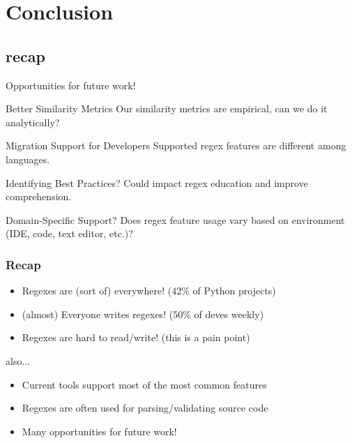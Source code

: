 \section{Conclusion}
\subsection{recap}


\begin{frame}{Opportunities for future work!}

\begin{block}{Better Similarity Metrics}
Our similarity metrics are empirical, can we do it analytically?
\end{block}



\begin{block}{Migration Support for Developers}
Supported regex features are different among languages.
\end{block}


\begin{block}{Identifying Best Practices?}
Could impact regex education and improve comprehension. 
\end{block}


\begin{block}{Domain-Specific Support?}
Does regex feature usage vary based on environment (IDE, code, text editor, etc.)?
\end{block}



\end{frame}

\begin{frame}
\frametitle{Recap}

\begin{itemize}
\item Regexes are (sort of) everywhere! (42\% of Python projects)
\item (almost) Everyone writes regexes! (50\% of deves weekly)
\item Regexes are hard to read/write! (this is a pain point)
\end{itemize}

also...

\begin{itemize}
\item Current tools support most of the most common features
\item Regexes are often used for parsing/validating source code 
\item Many opportunities for future work!
\end{itemize}


\end{frame}


